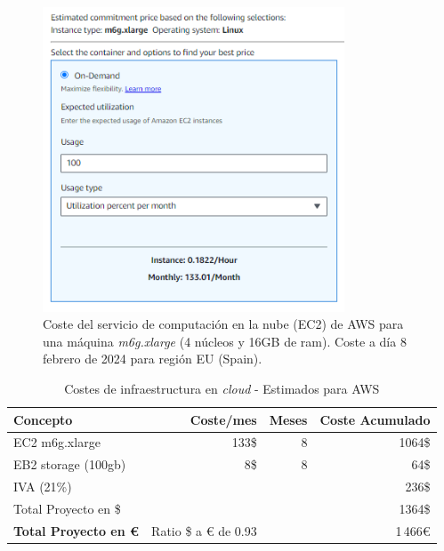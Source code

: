 \begin{figure}[ht]
    \centering
	\includegraphics[width=0.8\textwidth]{img/ec2_cost.PNG}
	\caption[Coste del servicio de computación en la nube (EC2) de AWS para una máquina \textit{m6g.xlarge}]{Coste del servicio de computación en la nube (EC2) de AWS para una máquina \textit{m6g.xlarge}  (4 núcleos y 16GB de ram). Coste a día 8 febrero de 2024 para región EU (Spain).}
	\label{fig:ec2_costs}
\end{figure}


\begin{table}[!ht]
	\centering
	\begin{tabular}{lrrr}
		\toprule
		\textbf{Concepto} & \textbf{Coste/mes} & \textbf{Meses} & \textbf{Coste Acumulado} \\
		\midrule
		EC2 m6g.xlarge & 133\$ & 8 & 1064\$\\
        EB2 storage (100gb) & 8\$ & 8 & 64\$\\
		\midrule
        IVA (21\%) & & & 236\$ \\
		\midrule
		{Total Proyecto en \$} & & & 1364\$ \\
        \midrule
		\textbf{Total Proyecto en €} & Ratio \$ a € de 0.93 & & 1\,466€ \\
		\bottomrule
	\end{tabular}
	\caption{Costes de infraestructura en \textit{cloud} - Estimados para AWS}
	\label{tab:infraestructura_aws}
\end{table}


